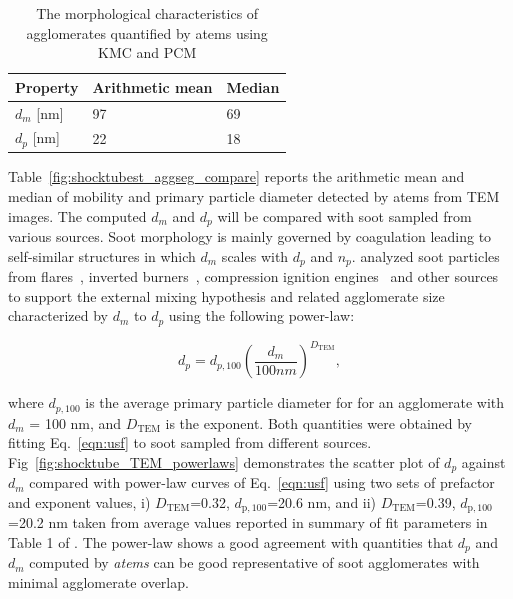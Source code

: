 \begin{table}
	\caption{The morphological characteristics of agglomerates quantified by atems using KMC and PCM}
	\label{tab:shocktube_TEM_morph}
	\centering
	\begin{tabular}{l l l}
		\hline
		Property & Arithmetic mean & Median \\
		\hline
		$d_m$ [nm] & 97 & 69 \\
		$d_p$ [nm] & 22 & 18 \\
		\hline
	\end{tabular}
\end{table}


Table~\ref{fig:shocktubest_aggseg_compare} reports the arithmetic mean and median of mobility and primary particle diameter detected by atems from TEM images. The computed $d_m$ and $d_p$ will be compared with soot sampled from various sources. Soot morphology is mainly governed by coagulation leading to self-similar structures in which $d_m$ scales with $d_p$ and $n_p$. 
\citet{olfert2019universal} analyzed soot particles from flares~\citep{kazemimanesh2019size}, inverted burners~\citep{dastanpour2017variation}, compression ignition engines~\citep{graves2015characterization} and other sources to support the external mixing hypothesis and related agglomerate size characterized by $d_m$ to $d_p$ using the following power-law:

\begin{equation}
	d_{p} = d_{p,100} 
	\left(
	\frac{d_m}{100 nm}
	\right)^{D_{\mathrm{TEM}}},
	\label{eqn:usf}
\end{equation}

\noindent where $d_{p,100}$ is the average primary particle diameter for for an agglomerate with $d_m$ = 100 nm, and $D_{\mathrm{TEM}}$ is the exponent. Both quantities were obtained by fitting Eq.~\eqref{eqn:usf} to soot sampled from different sources. Fig~\ref{fig:shocktube_TEM_powerlaws} demonstrates the scatter plot of $d_p$ against $d_m$ compared with power-law curves of Eq.~\eqref{eqn:usf} using two sets of prefactor and exponent values, i) $D_{\mathrm{TEM}}$=0.32, $d_{\mathrm{p,100}}$=20.6 nm, and ii) $D_{\mathrm{TEM}}$=0.39, $d_{\mathrm{p,100}}$=20.2 nm taken from average values reported in summary of fit parameters in Table 1 of \citet{olfert2019universal}. The power-law shows a good agreement with quantities that $d_p$ and $d_m$ computed by \textit{atems} can be good representative of soot agglomerates with minimal agglomerate overlap.

